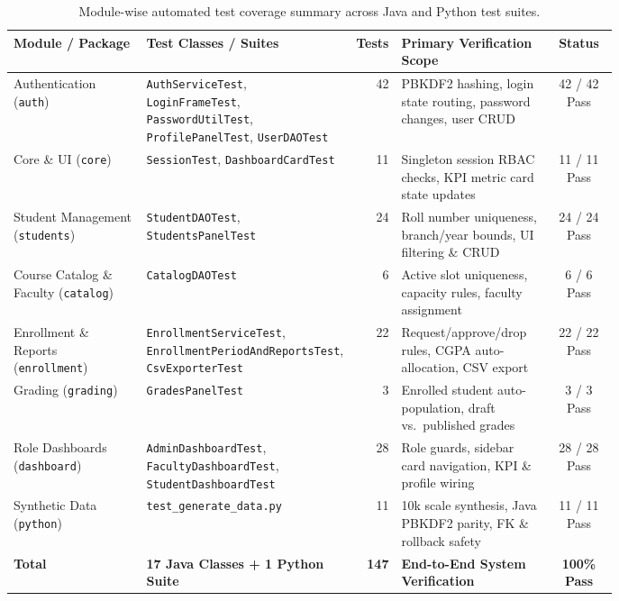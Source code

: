 \begin{table}[H]
\centering
\small
\begin{tabular}{|p{0.22\linewidth}|p{0.31\linewidth}|r|p{0.25\linewidth}|c|}
\hline
\textbf{Module / Package} & \textbf{Test Classes / Suites} & \textbf{Tests} & \textbf{Primary Verification Scope} & \textbf{Status} \\ \hline
Authentication (\texttt{auth}) & \texttt{AuthServiceTest}, \texttt{LoginFrameTest}, \texttt{PasswordUtilTest}, \texttt{ProfilePanelTest}, \texttt{UserDAOTest} & 42 & PBKDF2 hashing, login state routing, password changes, user CRUD & 42 / 42 Pass \\ \hline
Core \& UI (\texttt{core}) & \texttt{SessionTest}, \texttt{DashboardCardTest} & 11 & Singleton session RBAC checks, KPI metric card state updates & 11 / 11 Pass \\ \hline
Student Management (\texttt{students}) & \texttt{StudentDAOTest}, \texttt{StudentsPanelTest} & 24 & Roll number uniqueness, branch/year bounds, UI filtering \& CRUD & 24 / 24 Pass \\ \hline
Course Catalog \& Faculty (\texttt{catalog}) & \texttt{CatalogDAOTest} & 6 & Active slot uniqueness, capacity rules, faculty assignment & 6 / 6 Pass \\ \hline
Enrollment \& Reports (\texttt{enrollment}) & \texttt{EnrollmentServiceTest}, \texttt{EnrollmentPeriodAndReportsTest}, \texttt{CsvExporterTest} & 22 & Request/approve/drop rules, CGPA auto-allocation, CSV export & 22 / 22 Pass \\ \hline
Grading (\texttt{grading}) & \texttt{GradesPanelTest} & 3 & Enrolled student auto-population, draft vs.\ published grades & 3 / 3 Pass \\ \hline
Role Dashboards (\texttt{dashboard}) & \texttt{AdminDashboardTest}, \texttt{FacultyDashboardTest}, \texttt{StudentDashboardTest} & 28 & Role guards, sidebar card navigation, KPI \& profile wiring & 28 / 28 Pass \\ \hline
Synthetic Data (\texttt{python}) & \texttt{test\_generate\_data.py} & 11 & 10k scale synthesis, Java PBKDF2 parity, FK \& rollback safety & 11 / 11 Pass \\ \hline
\textbf{Total} & \textbf{17 Java Classes + 1 Python Suite} & \textbf{147} & \textbf{End-to-End System Verification} & \textbf{100\% Pass} \\ \hline
\end{tabular}
\caption{Module-wise automated test coverage summary across Java and Python test suites.}
\label{tab:test-coverage-summary}
\end{table}

